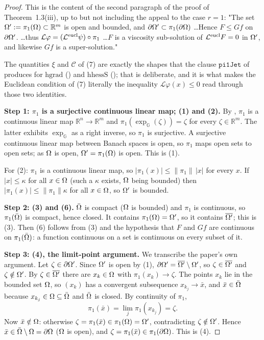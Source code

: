 \begin{proof}
This is the content of the second paragraph of the proof of Theorem~1.3(iii), up to but not
including the appeal to the case $r=1$: "The set $\Omega':=\pi_1(\Omega)\subset\mathbb R^{m}$ is
open and bounded, and $\partial\Omega'\subset\pi_1(\partial\Omega)$ \dots Hence $F\le Gf$ on $\partial\Omega'$.
\dots thus $\mathcal L\varphi=(\mathcal L^{\rm eucl}\psi)\circ\pi_1$ \dots $F$ is a viscosity
sub-solution of $\mathcal L^{\rm eucl}F=0$ in $\Omega'$, and likewise $Gf$ is a
super-solution."

The quantities $\xi$ and $\mathcal C$ of (7) are exactly the shapes that the clause
$\mathtt{pi1Jet}$ of  produces for $\mathrm{hgrad}$
() and $\mathrm{hhessS}$ (); that is deliberate, and it is
what makes the Euclidean condition of (7) literally the inequality $\mathcal L\varphi(x)\le0$
read through those two identities.

\medskip\noindent\textbf{Step 1: $\pi_1$ is a surjective continuous linear map; (1) and
(2).} By , $\pi_1$ is a continuous linear map
$\mathbb R^{n}\to\mathbb R^{m}$ and $\pi_1(\exp_{\mathbb G}(\zeta))=\zeta$ for every
$\zeta\in\mathbb R^{m}$. The latter exhibits $\exp_{\mathbb G}$ as a right inverse, so
$\pi_1$ is surjective. A surjective continuous linear map between Banach spaces is open, so
$\pi_1$ maps open sets to open sets; as $\Omega$ is open, $\Omega'=\pi_1(\Omega)$ is open. This is (1).

For (2): $\pi_1$ is a continuous linear map, so $|\pi_1(x)|\le\|\pi_1\|\,|x|$ for every $x$.
If $|x|\le \kappa$ for all $x\in\Omega$ (such a $\kappa$ exists, $\Omega$ being bounded) then
$|\pi_1(x)|\le\|\pi_1\|\kappa$ for all $x\in\Omega$, so $\Omega'$ is bounded.

\medskip\noindent\textbf{Step 2: (3) and (6).} $\bar{\Omega}$ is compact ($\Omega$ is bounded) and
$\pi_1$ is continuous, so $\pi_1(\bar{\Omega})$ is compact, hence closed. It contains
$\pi_1(\Omega)=\Omega'$, so it contains $\overline{\Omega'}$; this is (3). Then (6) follows from (3)
and the hypothesis that $F$ and $Gf$ are continuous on $\pi_1(\bar{\Omega})$: a function
continuous on a set is continuous on every subset of it.

\medskip\noindent\textbf{Step 3: (4), the limit-point argument.} We transcribe the paper's
own argument. Let $\zeta\in\partial\Omega'$. Since $\Omega'$ is open by (1),
$\partial\Omega'=\overline{\Omega'}\setminus\Omega'$, so $\zeta\in\overline{\Omega'}$ and $\zeta\notin\Omega'$. By
$\zeta\in\overline{\Omega'}$ there are $x_k\in\Omega$ with $\pi_1(x_k)\to\zeta$. The points $x_k$
lie in the bounded set $\Omega$, so $(x_k)$ has a convergent subsequence
$x_{k_j}\to\bar x$, and $\bar x\in\bar{\Omega}$ because $x_{k_j}\in\Omega\subseteq\bar{\Omega}$ and
$\bar{\Omega}$ is closed. By continuity of $\pi_1$,
\[
 \pi_1(\bar x)=\lim_j\pi_1(x_{k_j})=\zeta .
\]
Now $\bar x\notin\Omega$: otherwise $\zeta=\pi_1(\bar x)\in\pi_1(\Omega)=\Omega'$, contradicting
$\zeta\notin\Omega'$. Hence $\bar x\in\bar{\Omega}\setminus\Omega=\partial\Omega$ ($\Omega$ is open), and
$\zeta=\pi_1(\bar x)\in\pi_1(\partial\Omega)$. This is (4).


\end{proof}
